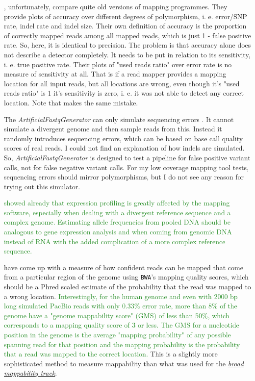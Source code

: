 \documentclass{article}\usepackage[]{graphicx}\usepackage[]{color}
\newcommand{\roger}[1]{ \textcolor[named]{ForestGreen}{#1} }
\begin{document}
\cite{Ruffalo2011}, unfortunately, compare quite old versions of mapping programmes. They provide plots of \textsf{accuracy} over different degrees of polymorphism, i. e. error/SNP rate, indel rate and indel size. Their own definition of \textsf{accuracy} is the proportion of correctly mapped reads among all mapped reads, which is just 1 - \textsf{false positive rate}. So, here, it is identical to \textsf{precision}. The problem is that accuracy alone does not describe a detector completely. It needs to be put in relation to its \textsf{sensitivity}, i. e. \textsf{true positive rate}. Their plots of "used reads ratio" over error rate is no measure of sensitivity at all. That is if a read mapper provides a mapping location for all input reads, but all locations are wrong, even though it's "used reads ratio" is 1 it's sensitivity is zero, i. e. it was not able to detect any correct location. Note that \cite{Li2013} makes the same mistake. 

The \textit{ArtificialFastqGenerator} can only simulate sequencing errors \citep{Frampton2012}. It cannot simulate a divergent genome and then sample reads from this. Instead it randomly introduces sequencing errors, which can be based on base call quality scores of real reads. I could not find an explanation of how indels are simulated. So, \textit{ArtificialFastqGenerator} is designed to test a pipeline for false positive variant calls, not for false negative variant calls. For my low coverage mapping tool tests, sequencing errors should mirror polymorphisms, but I do not see any reason for trying out this simulator.

\roger{\cite{Palmieri2009} showed already that expression profiling is greatly affected by the mapping software, especially when dealing with a divergent reference sequence and a complex genome. Estimating allele frequencies from pooled DNA should be analogous to gene expression analysis and when coming from genomic DNA instead of RNA with the added complication of a more complex reference sequence.}

\cite{Lee2012a} have come up with a measure of how confident reads can be mapped that come from a particular region of the genome using \texttt{BWA}'s mapping quality scores, which should be a Phred scaled estimate of the probability that the read was mapped to a wrong location. \roger{Interestingly, for the human genome and even with 2000 bp long simulated PacBio reads with only 0.33\% error rate, more than 8\% of the genome have a "genome mappability score" (GMS) of less than 50\%, which corresponds to a mapping quality score of 3 or less. The GMS for a nucleotide position in the genome is the average "mapping probability" of any possible spanning read for that position and the mapping probability is the probability that a read was mapped to the correct location.} This is a slightly more sophisticated method to measure mappability than what was used for the \href{http://genomebrowser.wustl.edu/cgi-bin/hgTrackUi?db=hg18\&g=wgEncodeMapability}{\textit{broad mappability track}}.
\end{document}
